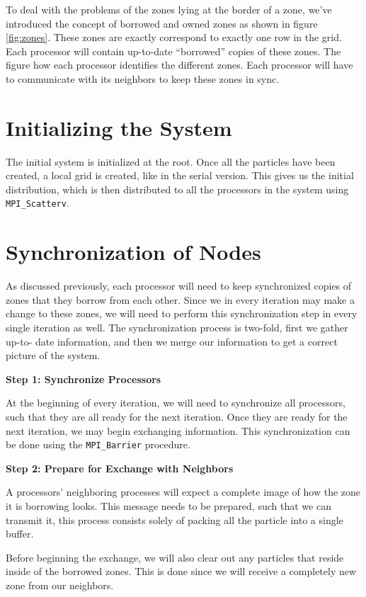 
To deal with the problems of the zones lying at the border of a zone, we've introduced the concept of borrowed and owned
zones as shown in figure \ref{fig:zones}. These zones are exactly correspond to exactly one row in the grid. Each
processor will contain up-to-date ``borrowed'' copies of these zones. The figure how each processor identifies the
different zones. Each processor will have to communicate with its neighbors to keep these zones in sync.

\section{Initializing the System}

The initial system is initialized at the root. Once all the particles have been created, a local grid is created, like
in the serial version. This gives us the initial distribution, which is then distributed to all the processors in the
system using \verb!MPI_Scatterv!.

\section{Synchronization of Nodes}

As discussed previously, each processor will need to keep synchronized copies of zones that they borrow
from each other. Since we in every iteration may make a change to these zones, we will need to perform this
synchronization step in every single iteration as well. The synchronization process is two-fold, first we gather up-to-
date information, and then we merge our information to get a correct picture of the system.

\textbf{Step 1: Synchronize Processors}

At the beginning of every iteration, we will need to synchronize all processors, such that they are all ready for the
next iteration. Once they are ready for the next iteration, we may begin exchanging information. This synchronization
can be done using the \verb!MPI_Barrier! procedure.

\textbf{Step 2: Prepare for Exchange with Neighbors}

A processors' neighboring processes will expect a complete image of how the zone it is borrowing looks. This message 
needs to be prepared, such that we can transmit it, this process consists solely of packing all the particle into a 
single buffer.

Before beginning the exchange, we will also clear out any particles that reside inside of the borrowed zones. This is
done since we will receive a completely new zone from our neighbors.

